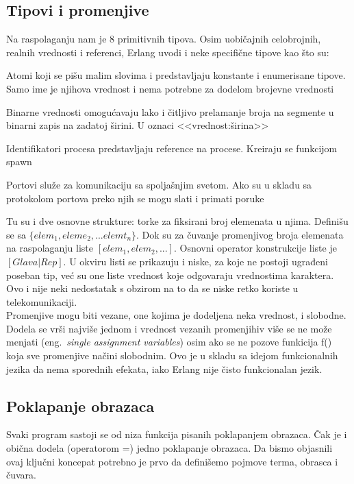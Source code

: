 \documentclass[a4paper]{article}
\begin{document}
{\subsection{Tipovi i promenjive}
Na raspolaganju nam je 8 primitivnih tipova. Osim uobičajnih celobrojnih, realnih vrednosti i referenci, Erlang uvodi i neke specifične tipove kao što su:

\begin{list}{•}{}
\item Atomi koji se pišu malim slovima i predstavljaju konstante i enumerisane tipove. Samo ime je njihova vrednost i nema potrebne za dodelom brojevne vrednosti
\item Binarne vrednosti omogućavaju lako i čitljivo prelamanje broja na segmente u binarni zapis na zadatoj širini. U oznaci <<vrednost:širina>>
\item Identifikatori procesa predstavljaju reference na procese. Kreiraju se funkcijom spawn
\item Portovi služe za komunikaciju sa spoljašnjim svetom. Ako su u skladu sa protokolom portova preko njih se mogu slati i primati poruke
\end{list}
 
Tu su i dve osnovne strukture: torke za fiksirani broj elemenata u njima. Definišu se sa $\{elem_1, eleme_2, ... elemt_n\}$. 
Dok su za čuvanje promenjivog broja elemenata na raspolaganju liste $[elem_1, elem_2, ...]$. Osnovni operator konstrukcije liste je $[Glava | Rep]$. U okviru listi se prikazuju i niske, za koje ne postoji ugrađeni poseban tip, već su one liste vrednost koje odgovaraju vrednostima karaktera. 
Ovo i nije neki nedostatak s obzirom na to da se niske retko koriste u telekomunikaciji.\\

Promenjive mogu biti vezane, one kojima je dodeljena neka vrednost, i slobodne. Dodela se vrši najviše jednom i vrednost vezanih promenjihiv više se ne može menjati (eng.~{\em single assignment variables}) osim ako se ne pozove funkicija f() koja sve promenjive načini slobodnim. 
Ovo je u skladu sa idejom funkcionalnih jezika da nema sporednih efekata, iako Erlang nije čisto funkcionalan jezik.


\subsection{Poklapanje obrazaca}
Svaki program sastoji se od niza funkcija pisanih poklapanjem obrazaca. Čak je i obična dodela (operatorom =) jedno poklapanje obrazaca.
Da bismo objasnili ovaj ključni koncepat potrebno je prvo da definišemo pojmove terma, obrasca i čuvara.

}
\end{document}
